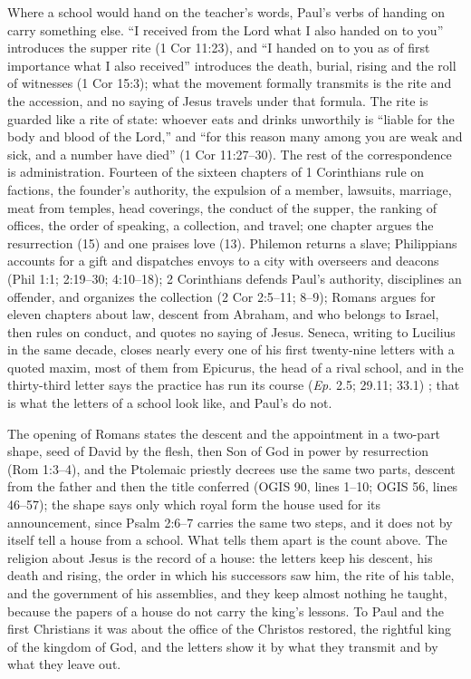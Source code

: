 Where a school would hand on the teacher's words, Paul's verbs of handing on carry something else.
``I received from the Lord what I also handed on to you'' introduces the supper rite (1 Cor 11:23), and ``I handed on to you as of first importance what I also received'' introduces the death, burial, rising and the roll of witnesses (1 Cor 15:3); what the movement formally transmits is the rite and the accession, and no saying of Jesus travels under that formula.
The rite is guarded like a rite of state: whoever eats and drinks unworthily is ``liable for the body and blood of the Lord,'' and ``for this reason many among you are weak and sick, and a number have died'' (1 Cor 11:27--30).
The rest of the correspondence is administration.
Fourteen of the sixteen chapters of 1 Corinthians rule on factions, the founder's authority, the expulsion of a member, lawsuits, marriage, meat from temples, head coverings, the conduct of the supper, the ranking of offices, the order of speaking, a collection, and travel; one chapter argues the resurrection (15) and one praises love (13).
Philemon returns a slave; Philippians accounts for a gift and dispatches envoys to a city with overseers and deacons (Phil 1:1; 2:19--30; 4:10--18); 2 Corinthians defends Paul's authority, disciplines an offender, and organizes the collection (2 Cor 2:5--11; 8--9); Romans argues for eleven chapters about law, descent from Abraham, and who belongs to Israel, then rules on conduct, and quotes no saying of Jesus.
Seneca, writing to Lucilius in the same decade, closes nearly every one of his first twenty-nine letters with a quoted maxim, most of them from Epicurus, the head of a rival school, and in the thirty-third letter says the practice has run its course (\emph{Ep.} 2.5; 29.11; 33.1) \cite{seneca:epistles}; that is what the letters of a school look like, and Paul's do not.

The opening of Romans states the descent and the appointment in a two-part shape, seed of David by the flesh, then Son of God in power by resurrection (Rom 1:3--4), and the Ptolemaic priestly decrees use the same two parts, descent from the father and then the title conferred (OGIS 90, lines 1--10; OGIS 56, lines 46--57); the shape says only which royal form the house used for its announcement, since Psalm 2:6--7 carries the same two steps, and it does not by itself tell a house from a school.
What tells them apart is the count above.
The religion about Jesus is the record of a house: the letters keep his descent, his death and rising, the order in which his successors saw him, the rite of his table, and the government of his assemblies, and they keep almost nothing he taught, because the papers of a house do not carry the king's lessons.
To Paul and the first Christians it was about the office of the Christos restored, the rightful king of the kingdom of God, and the letters show it by what they transmit and by what they leave out.

